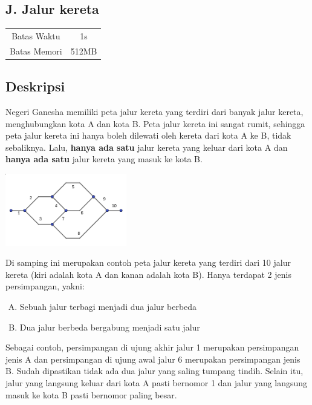 \documentclass{article}
\begin{document}
\begin{center}
    \section*{J. Jalur kereta}

    \begin{tabular}{ | c c | }
        \hline
        Batas Waktu  & 1s \\
        Batas Memori & 512MB \\
        \hline
    \end{tabular}
\end{center}

\subsection*{Deskripsi}

Negeri Ganesha memiliki peta jalur kereta yang terdiri dari banyak jalur kereta, menghubungkan kota A dan kota B.
Peta jalur kereta ini sangat rumit, sehingga peta jalur kereta ini hanya boleh dilewati oleh kereta dari kota A ke B, tidak sebaliknya.
Lalu, \textbf{hanya ada satu} jalur kereta yang keluar dari kota A dan \textbf{hanya ada satu} jalur kereta yang masuk ke kota B.

\begin{multicols}{2}
\begin{center}
    \includegraphics[width=200px]{sample-1}
\end{center}

Di samping ini merupakan contoh peta jalur kereta yang terdiri dari 10 jalur kereta (kiri adalah kota A dan kanan adalah kota B).
Hanya terdapat 2 jenis persimpangan, yakni:
\begin{enumerate}[A.]
    \setlength{\itemsep}{0pt}
    \item Sebuah jalur terbagi menjadi dua jalur berbeda
    \item Dua jalur berbeda bergabung menjadi satu jalur
\end{enumerate}
\end{multicols}

Sebagai contoh, persimpangan di ujung akhir jalur 1 merupakan persimpangan jenis A dan persimpangan di ujung awal jalur 6 merupakan persimpangan jenis B.
Sudah dipastikan tidak ada dua jalur yang saling tumpang tindih.
Selain itu, jalur yang langsung keluar dari kota A pasti bernomor 1 dan jalur yang langsung masuk ke kota B pasti bernomor paling besar.
\end{document}
